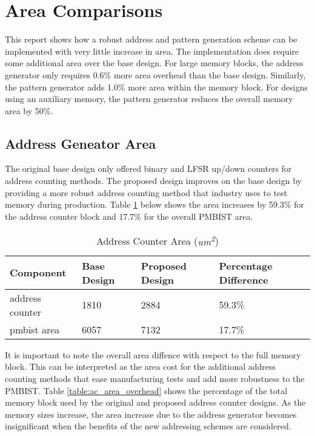 \section{Area Comparisons}
This report shows how a robust address and pattern generation scheme can be implemented with very little increase in area.  The implementation does require some additional area over the base design.  For large memory blocks, the address generator only requires 0.6\% more area overhead than the base design.  Similarly, the pattern generator adds 1.0\% more area within the memory block.  For designs using an auxiliary memory, the pattern generator reduces the overall memory area by 50\%.  

\label{sect:cln-area}
\subsection{Address Geneator Area}
The original base design only offered binary and LFSR up/down counters for address counting methods.  The proposed design improves on the base design by providing a more robust address counting method that industry uses to test memory during production.  Table \ref{table:ac_area_compare} below shows the area increases by  59.3\% for the address counter block and 17.7\% for the overall PMBIST area.  

\begin{table}[ht]
\caption{Address Counter Area (\textit{um\textsuperscript{2}})}
\centering
\begin{tabular}{| l | l | l | l |}
\hline
Component & Base Design & Proposed Design & Percentage Difference \\ [0.5ex]
\hline
address counter & 1810   & 2884   & 59.3\% \\
pmbist area     & 6057   & 7132   & 17.7\% \\ 
\hline
\end{tabular}
\label{table:ac_area_compare}
\end{table}

It is important to note the overall area diffence with respect to the full memory block.  This can be interpreted as the area cost for the additional address counting methods that ease manufacturing tests and add more robustness to the PMBIST.  Table \ref{table:ac_area_overhead} shows the percentage of the total memory block used by the original and proposed address counter designs.  As the memory sizes increase, the area increase due to the address generator becomes insignificant when the benefits of the new addressing schemes are considered.   

